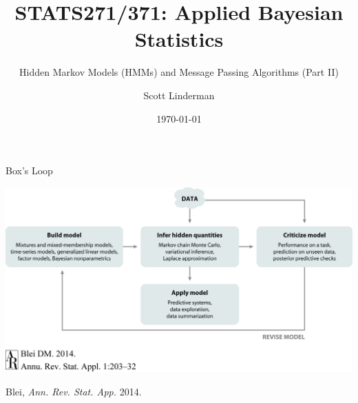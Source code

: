 \documentclass[aspectratio=169]{beamer}
\title{STATS271/371: Applied Bayesian Statistics}
\subtitle{Hidden Markov Models (HMMs) and Message Passing Algorithms (Part II)}
\author{Scott Linderman}
\date{\today}
\begin{document}
\maketitle

\begin{frame}{Box's Loop}
\begin{center}
\includegraphics[width=.85\linewidth]{figures/lap1/boxsloop.jpeg}\\
\end{center} 
\begin{flushright}
{\footnotesize Blei, \textit{Ann. Rev. Stat. App.} 2014.}
\end{flushright}
\end{frame}


\end{document}
